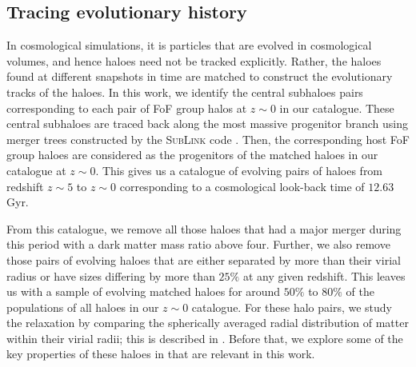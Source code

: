 \subsection{Tracing evolutionary history}
\label{sec:methods-tracehals}
In cosmological simulations, it is particles that are evolved in cosmological volumes, and hence haloes need not be tracked explicitly. Rather, the haloes found at different snapshots in time are matched to construct the evolutionary tracks of the haloes. In this work, we identify the central subhaloes pairs corresponding to each pair of FoF group halos at $z\sim 0$ in our catalogue. These central subhaloes are traced back along the most massive progenitor branch using merger trees constructed by the \textsc{SubLink} code \citep{2015RodriguezGeneletalSubLink}. Then, the corresponding host FoF group haloes are considered as the progenitors of the matched haloes in our catalogue at $z \sim 0$. This gives us a catalogue of evolving pairs of haloes from redshift $z \sim 5$ to $z \sim 0$ corresponding to a cosmological look-back time of $12.63$ Gyr.

From this catalogue, we remove all those haloes that had a major merger during this period with a dark matter mass ratio above four. Further, we also remove those pairs of evolving haloes that are either separated by more than their virial radius or have sizes differing by more than $25\% $ at any given redshift. This leaves us with a sample of evolving matched haloes for around $50\%$ to $80\%$ of the populations of all haloes in our $z \sim 0$ catalogue. For these halo pairs, we study the relaxation by comparing the spherically averaged radial distribution of matter within their virial radii; this is described in  . Before that, we explore some of the key properties of these haloes in  that are relevant in this work.

